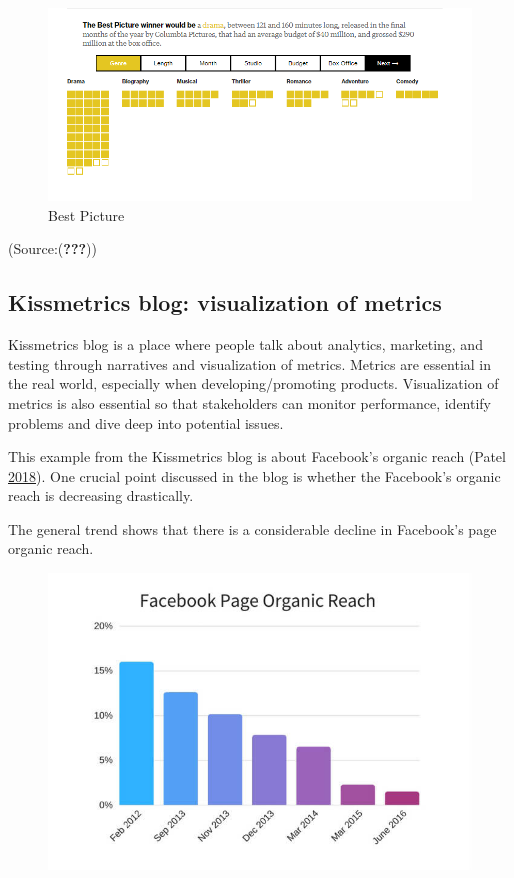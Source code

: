 \documentclass[]{book}
\begin{document}
\begin{figure}
\centering
\includegraphics{images/img_oscars_pic.PNG}
\caption{Best Picture}
\end{figure}

(Source:({\textbf{???}}))

\subsection{Kissmetrics blog: visualization of
metrics}\label{kissmetrics-blog-visualization-of-metrics}

Kissmetrics blog is a place where people talk about analytics,
marketing, and testing through narratives and visualization of metrics.
Metrics are essential in the real world, especially when
developing/promoting products. Visualization of metrics is also
essential so that stakeholders can monitor performance, identify
problems and dive deep into potential issues.

This example from the Kissmetrics blog is about Facebook's organic reach
(Patel \protect\hyperlink{ref-facebook_organic}{2018}). One crucial
point discussed in the blog is whether the Facebook's organic reach is
decreasing drastically.

The general trend shows that there is a considerable decline in
Facebook's page organic reach.

\begin{figure}
\centering
\includegraphics{images/facebook-page-organic-reach-decline-over-years.jpg}
\caption{}
\end{figure}
\end{document}
